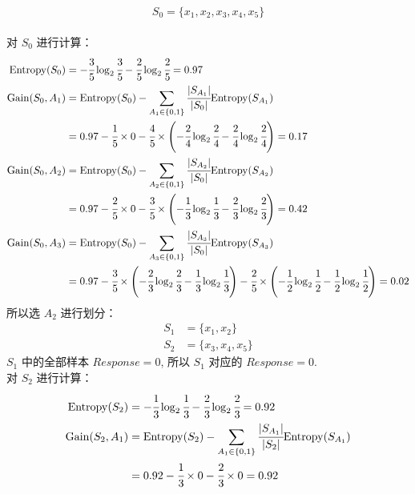 \documentclass[11pt,letter,notitlepage]{article}
\begin{document}
\begin{solution}
	$$S_0=\{x_1,x_2,x_3,x_4,x_5\}$$ \\
	对 $S_0$ 进行计算：
	$$\begin{aligned}
			{\rm Entropy}(S_0)
			 & = -\cfrac{3}{5}\log_2\cfrac{3}{5}-\cfrac{2}{5}\log_2\cfrac{2}{5}=0.97                    \\
			{\rm Gain}(S_0,A_1)
			 & = {\rm Entropy}(S_0)-\sum_{A_1\in\{0,1\}}\cfrac{|S_{A_1}|}{|S_0|}{\rm Entropy}(S_{A_1})  \\
			 & =0.97
			-\cfrac{1}{5}\times0
			-\cfrac{4}{5}\times\left(-\cfrac{2}{4}\log_2\cfrac{2}{4}-\cfrac{2}{4}\log_2\cfrac{2}{4}\right)
			=0.17                                                                                       \\
			{\rm Gain}(S_0,A_2)
			 & = {\rm Entropy}(S_0)-\sum_{A_2\in\{0,1\}}\cfrac{|S_{A_2}|}{|S_0|}{\rm Entropy}(S_{A_2})  \\
			 & =0.97
			-\cfrac{2}{5}\times0
			-\cfrac{3}{5}\times\left(-\cfrac{1}{3}\log_2\cfrac{1}{3}-\cfrac{2}{3}\log_2\cfrac{2}{3}\right)
			=0.42                                                                                       \\
			{\rm Gain}(S_0,A_3)
			 & = {\rm Entropy}(S_0) -\sum_{A_3\in\{0,1\}}\cfrac{|S_{A_3}|}{|S_0|}{\rm Entropy}(S_{A_3}) \\
			 & =0.97
			-\cfrac{3}{5}\times\left(-\cfrac{2}{3}\log_2\cfrac{2}{3}-\cfrac{1}{3}\log_2\cfrac{1}{3}\right)
			-\cfrac{2}{5}\times\left(-\cfrac{1}{2}\log_2\cfrac{1}{2}-\cfrac{1}{2}\log_2\cfrac{1}{2}\right)
			=0.02
		\end{aligned}$$
	所以选 $A_2$ 进行划分：
	$$\begin{aligned}
			S_1 & =\{x_1,x_2\}     \\
			S_2 & =\{x_3,x_4,x_5\}
		\end{aligned}$$
	$S_1$ 中的全部样本 $Response=0$, 所以 $S_1$ 对应的 $Response=0$. \\
	对 $S_2$ 进行计算：
	$$\begin{aligned}
			{\rm Entropy}(S_2)
			 & = -\cfrac{1}{3}\log_2\cfrac{1}{3}-\cfrac{2}{3}\log_2\cfrac{2}{3}=0.92                   \\
			{\rm Gain}(S_2,A_1)
			 & = {\rm Entropy}(S_2)-\sum_{A_1\in\{0,1\}}\cfrac{|S_{A_1}|}{|S_2|}{\rm Entropy}(S_{A_1}) \\
			 & =0.92
			-\cfrac{1}{3}\times0
			-\cfrac{2}{3}\times0
			=0.92                                                                                      \\

\end{aligned}$$
\end{solution}
\end{document}
